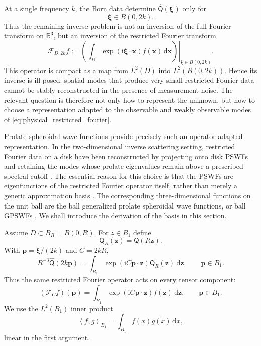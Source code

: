 \documentclass[11pt]{article}
\numberwithin{equation}{section}
\newcommand{\R}{\mathbb{R}}
\newcommand{\ii}{\mathrm{i}}
\newcommand{\dd}{\,\mathrm d}
\newcommand{\vect}[1]{\bm{#1}}
\newcommand{\tens}[1]{\bm{\mathsf{#1}}}
\newcommand{\F}{\mathcal{F}}
\newcommand{\Qt}{\ensuremath{\tens{Q}}}
\newcommand{\inner}[2]{\left\langle #1,#2\right\rangle}
\theoremstyle{plain}
\theoremstyle{definition}
\begin{document}
At a single frequency \(k\), the Born data determine
\(\widehat{\Qt}(\vect{\xi})\) only for
\begin{equation*}
  \vect{\xi}\in B(0,2k).
\end{equation*}
Thus the remaining inverse problem is not an inversion of the full Fourier
transform on \(\R^3\), but an inversion of the restricted Fourier transform
\begin{equation}\label{eq:physical_restricted_fourier}
  \mathcal F_{D,2k}f
  :=
  \left.
  \left(
    \int_D
    \exp(\ii\vect{\xi}\cdot\vect{x})
    f(\vect{x})
    \dd\vect{x}
  \right)
  \right|_{\vect{\xi}\in B(0,2k)} .
\end{equation}
This operator is compact as a map from \(L^2(D)\) into
\(L^2(B(0,2k))\).  Hence its inverse is ill-posed: spatial modes that produce
very small restricted Fourier data cannot be stably reconstructed in the
presence of measurement noise.  The relevant question is therefore not only
how to represent the unknown, but how to choose a representation adapted to
the observable and weakly observable modes of
\eqref{eq:physical_restricted_fourier}.

Prolate spheroidal wave functions provide precisely such an
operator-adapted representation.  In the two-dimensional inverse scattering
setting, restricted Fourier data on a disk have been reconstructed by
projecting onto disk PSWFs and retaining the modes whose prolate eigenvalues
remain above a prescribed spectral cutoff
\cite{ZhouAudibertMengZhang2025,Meng2023}.  The essential reason for this
choice is that the PSWFs are eigenfunctions of the restricted Fourier operator
itself, rather than merely a generic approximation basis
\cite{Slepian1964}.  The corresponding three-dimensional functions on the
unit ball are the ball generalized prolate spheroidal wave functions, or ball
GPSWFs \cite{ZhangLiWangZhang2020,IsaevNovikov2022}. We shall introduce the derivation of the basis in this section. 



Assume $D\subset B_R=B(0,R)$.  For $z\in B_1$ define
\begin{equation*}
  \Qt_R(\vect{z})=\Qt(R\vect{z}).
\end{equation*}
With $\vect{p}=\vect{\xi}/(2k)$ and $C=2kR$,
\begin{equation*}
  R^{-3}\widehat{\Qt}(2k\vect{p})=\int_{B_1}\exp(\ii C\vect{p}\cdot \vect{z})\Qt_R(\vect{z})\dd \vect{z},
  \qquad \vect{p}\in B_1 .
\end{equation*}
Thus the same restricted Fourier operator acts on every tensor component:
\begin{equation*}
  (\F_C f)(\vect{p})=\int_{B_1}\exp(\ii C\vect{p}\cdot \vect{z})f(\vect{z})\dd \vect{z},
  \qquad \vect{p}\in B_1 .
\end{equation*}
We use the $L^2(B_1)$ inner product
\begin{equation*}
  \inner{f}{g}_{B_1}=\int_{B_1}f(x)\overline{g(x)}\dd x,
\end{equation*}
linear in the first argument.
\end{document}
